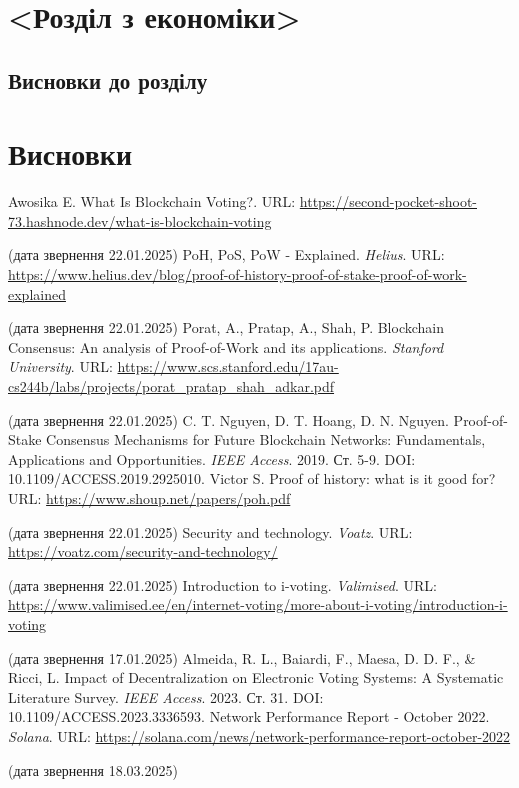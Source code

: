 \documentclass[14pt]{extreport}
\begin{document}
  \chapter{<Розділ з економіки>}
  
  \section{}
  \section{Висновки до розділу}
  
  \chapter*{Висновки}
  
  \renewcommand\bibname{\MakeUppercase{Список літератури}}
  \begin{thebibliography}{99}
     Awosika E. What Is Blockchain Voting?. URL: \url{https://second-pocket-shoot-73.hashnode.dev/what-is-blockchain-voting}

    (дата звернення 22.01.2025)
     PoH, PoS, PoW - Explained. \textit{Helius}. URL: \url{https://www.helius.dev/blog/proof-of-history-proof-of-stake-proof-of-work-explained}
    
    (дата звернення 22.01.2025)
     Porat, A., Pratap, A., Shah, P. Blockchain Consensus: An analysis of Proof-of-Work and its applications. \textit{Stanford University}. URL: \url{https://www.scs.stanford.edu/17au-cs244b/labs/projects/porat_pratap_shah_adkar.pdf}
    
    (дата звернення 22.01.2025)
     C. T. Nguyen, D. T. Hoang, D. N. Nguyen. Proof-of-Stake Consensus Mechanisms for Future Blockchain Networks: Fundamentals, Applications and Opportunities. \textit{IEEE Access}. 2019. Ст. 5-9. DOI: 10.1109/ACCESS.2019.2925010.
     Victor S. Proof of history: what is it good for? URL: \url{https://www.shoup.net/papers/poh.pdf}
    
    (дата звернення 22.01.2025)
     Security and technology. \textit{Voatz}. URL: \url{https://voatz.com/security-and-technology/}
    
    (дата звернення 22.01.2025)
     Introduction to i-voting. \textit{Valimised}. 
    URL: \url{https://www.valimised.ee/en/internet-voting/more-about-i-voting/introduction-i-voting}
    
    (дата звернення 17.01.2025)
     Almeida, R. L., Baiardi, F., Maesa, D. D. F., \& Ricci, L. Impact of Decentralization on Electronic Voting Systems: A Systematic Literature Survey. \textit{IEEE Access}. 2023. Ст. 31. DOI: 10.1109/ACCESS.2023.3336593.
     Network Performance Report - October 2022. \textit{Solana}. URL: \url{https://solana.com/news/network-performance-report-october-2022}
    
    (дата звернення 18.03.2025)
  \end{thebibliography}
  
\end{document}
